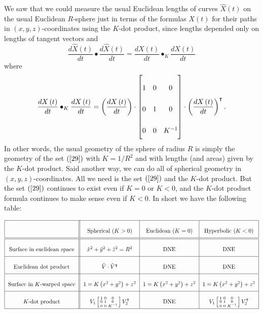 \documentclass{ximera}
\begin{document}
We saw that we could measure the usual Euclidean lengths of curves $\hat
{X}\left(  t\right)  $ on the usual Euclidean $R$-sphere just in terms of the
formulas $X\left(  t\right)  $ for their paths in $\left(  x,y,z\right)
$-coordinates using the $K$-dot product, since lengths depended only on
lengths of tangent vectors and%
\[
\frac{d\hat{X}\left(  t\right)  }{dt}\bullet\frac{d\hat{X}\left(  t\right)
}{dt}=\frac{dX\left(  t\right)  }{dt}\bullet_{K}\frac{dX\left(  t\right)
}{dt}%
\]
where%
\[
\frac{dX\left(  t\right)  }{dt}\bullet_{K}\frac{dX\left(  t\right)  }%
{dt}=\left(  \frac{dX\left(  t\right)  }{dt}\right)  \cdot\begin{bmatrix}
1 & 0 & 0\\
0 & 1 & 0\\
0 & 0 & K^{-1}%
\end{bmatrix}  \cdot\left(  \frac{dX\left(  t\right)  }{dt}\right)  ^\transpose.
\]
In other words, the usual geometry of the sphere of radius $R$ is simply the
geometry of the set $\left(  \ref{29}\right)  $ with $K=1/R^{2}$ and with
lengths (and areas) given by the $K$-dot product. Said another way, we can do
all of spherical geometry in $\left(  x,y,z\right)  $-coordinates. All we need
is the set $\left(  \ref{29}\right)  $ and the $K$-dot product. But the set
$\left(  \ref{29}\right)  $ continues to exist even if $K=0$ or $K<0$, and the
$K$-dot product formula continues to make sense even if $K<0$. In short we
have the following table:

\[
{\renewcommand{\arraystretch}{2.5}
\begin{tabular}{|c||c|c|c|}\hline
                & Spherical ($K>0$) & Euclidean ($K=0$) & Hyperbolic ($K<0$)\\\hline\hline
Surface in euclidean space & $\hat{x}^{2}+\hat{y}^{2}+\hat{z}^{2}=R^{2}$ & DNE  & DNE \\\hline
Euclidean dot product & $\hat{V}\cdot \hat{V}^\transpose$ & DNE  & DNE\\\hline
Surface in $K$-warped space & $1=K\left(  x^{2}+y^{2}\right)  +z^{2}$ & $1=K\left(  x^{2}+y^{2}\right)+z^{2}$ & $1=K\left(  x^{2}+y^{2}\right)  +z^{2}$\\\hline
$K$-dot product & $V_{1}\left[\begin{smallmatrix}1 & 0 & 0\\ 0 & 1 & 0\\ 0 & 0 & K^{-1}\end{smallmatrix}\right] V_{2}^\transpose$ &  DNE & $V_{1}\left[\begin{smallmatrix}1 & 0 & 0\\ 0 & 1 & 0\\ 0 & 0 & K^{-1}\end{smallmatrix}\right]V_{2}^\transpose$\\\hline
\end{tabular}}
\]
\end{document}
